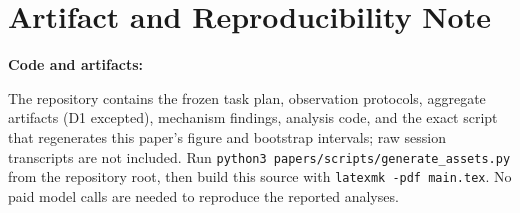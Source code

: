 \documentclass[10pt,twocolumn]{article}
\begin{document}
\section*{Artifact and Reproducibility Note}

\noindent\textbf{Code and artifacts:} \repo\par\smallskip
The repository contains the frozen task plan, observation protocols, aggregate artifacts (D1 excepted),
mechanism findings, analysis code, and the exact script that regenerates this paper's figure and
bootstrap intervals; raw session transcripts are not included.  Run
\texttt{python3 papers/scripts/generate\_assets.py} from the repository root, then build this source
with \texttt{latexmk -pdf main.tex}.  No paid model calls are needed to reproduce the reported
analyses.



\end{document}
